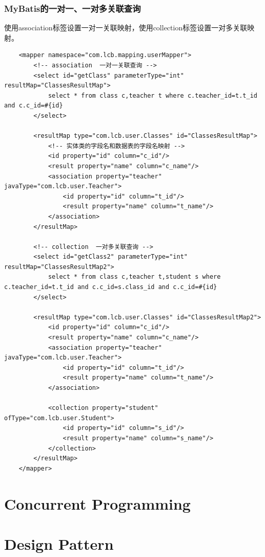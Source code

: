 \documentclass[a4paper]{report}
\begin{document}
\subsection{MyBatis的一对一、一对多关联查询}
使用association标签设置一对一关联映射，使用collection标签设置一对多关联映射。
\begin{verbatim}
    <mapper namespace="com.lcb.mapping.userMapper">
        <!-- association  一对一关联查询 -->
        <select id="getClass" parameterType="int" resultMap="ClassesResultMap">
            select * from class c,teacher t where c.teacher_id=t.t_id and c.c_id=#{id}
        </select>

        <resultMap type="com.lcb.user.Classes" id="ClassesResultMap">
            <!-- 实体类的字段名和数据表的字段名映射 -->
            <id property="id" column="c_id"/>
            <result property="name" column="c_name"/>
            <association property="teacher" javaType="com.lcb.user.Teacher">
                <id property="id" column="t_id"/>
                <result property="name" column="t_name"/>
            </association>
        </resultMap>

        <!-- collection  一对多关联查询 -->
        <select id="getClass2" parameterType="int" resultMap="ClassesResultMap2">
            select * from class c,teacher t,student s where c.teacher_id=t.t_id and c.c_id=s.class_id and c.c_id=#{id}
        </select>

        <resultMap type="com.lcb.user.Classes" id="ClassesResultMap2">
            <id property="id" column="c_id"/>
            <result property="name" column="c_name"/>
            <association property="teacher" javaType="com.lcb.user.Teacher">
                <id property="id" column="t_id"/>
                <result property="name" column="t_name"/>
            </association>

            <collection property="student" ofType="com.lcb.user.Student">
                <id property="id" column="s_id"/>
                <result property="name" column="s_name"/>
            </collection>
        </resultMap>
    </mapper>
\end{verbatim}

\chapter{Concurrent Programming}


\chapter{Design Pattern}
\end{document}
